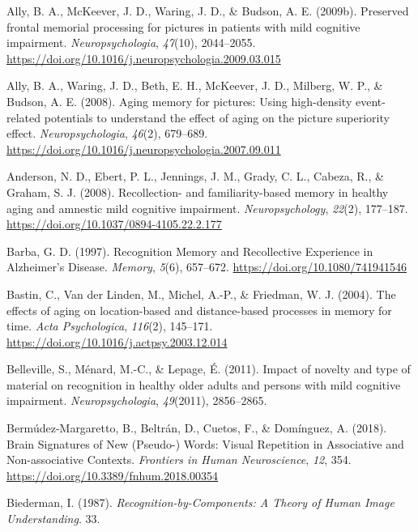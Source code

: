 \documentclass[
  11pt,
]{article}
\begin{document}
\leavevmode\hypertarget{ref-ally2009a}{}%
Ally, B. A., McKeever, J. D., Waring, J. D., \& Budson, A. E. (2009b).
Preserved frontal memorial processing for pictures in patients with mild
cognitive impairment. \emph{Neuropsychologia}, \emph{47}(10),
2044--2055. \url{https://doi.org/10.1016/j.neuropsychologia.2009.03.015}

\leavevmode\hypertarget{ref-ally2008}{}%
Ally, B. A., Waring, J. D., Beth, E. H., McKeever, J. D., Milberg, W.
P., \& Budson, A. E. (2008). Aging memory for pictures: Using
high-density event-related potentials to understand the effect of aging
on the picture superiority effect. \emph{Neuropsychologia},
\emph{46}(2), 679--689.
\url{https://doi.org/10.1016/j.neuropsychologia.2007.09.011}

\leavevmode\hypertarget{ref-anderson2008}{}%
Anderson, N. D., Ebert, P. L., Jennings, J. M., Grady, C. L., Cabeza,
R., \& Graham, S. J. (2008). Recollection- and familiarity-based memory
in healthy aging and amnestic mild cognitive impairment.
\emph{Neuropsychology}, \emph{22}(2), 177--187.
\url{https://doi.org/10.1037/0894-4105.22.2.177}

\leavevmode\hypertarget{ref-barba1997}{}%
Barba, G. D. (1997). Recognition Memory and Recollective Experience in
Alzheimer's Disease. \emph{Memory}, \emph{5}(6), 657--672.
\url{https://doi.org/10.1080/741941546}

\leavevmode\hypertarget{ref-bastin2004}{}%
Bastin, C., Van der Linden, M., Michel, A.-P., \& Friedman, W. J.
(2004). The effects of aging on location-based and distance-based
processes in memory for time. \emph{Acta Psychologica}, \emph{116}(2),
145--171. \url{https://doi.org/10.1016/j.actpsy.2003.12.014}

\leavevmode\hypertarget{ref-belleville2011}{}%
Belleville, S., Ménard, M.-C., \& Lepage, É. (2011). Impact of novelty
and type of material on recognition in healthy older adults and persons
with mild cognitive impairment. \emph{Neuropsychologia},
\emph{49}(2011), 2856--2865.

\leavevmode\hypertarget{ref-bermudez-margaretto2018}{}%
Bermúdez-Margaretto, B., Beltrán, D., Cuetos, F., \& Domínguez, A.
(2018). Brain Signatures of New (Pseudo-) Words: Visual Repetition in
Associative and Non-associative Contexts. \emph{Frontiers in Human
Neuroscience}, \emph{12}, 354.
\url{https://doi.org/10.3389/fnhum.2018.00354}

\leavevmode\hypertarget{ref-biederman1987}{}%
Biederman, I. (1987). \emph{Recognition-by-Components: A Theory of Human
Image Understanding}. 33.
\end{document}
